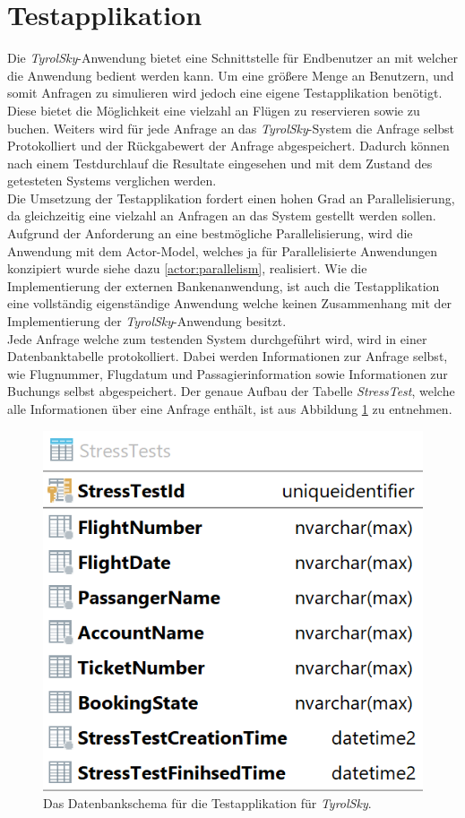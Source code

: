 \section{Testapplikation}
\label{subsec:implementation:TestApplikation} 
Die \textit{TyrolSky}-Anwendung bietet eine Schnittstelle für Endbenutzer an mit welcher die Anwendung bedient werden kann. Um eine größere Menge an Benutzern, und somit Anfragen zu simulieren wird jedoch eine eigene Testapplikation benötigt. Diese bietet die Möglichkeit eine vielzahl an Flügen zu reservieren sowie zu buchen. Weiters wird für jede Anfrage an das \textit{TyrolSky}-System die Anfrage selbst Protokolliert und der Rückgabewert der Anfrage abgespeichert. Dadurch können nach einem Testdurchlauf die Resultate eingesehen und mit dem Zustand des getesteten Systems verglichen werden. \\
Die Umsetzung der Testapplikation fordert einen hohen Grad an Parallelisierung, da gleichzeitig eine vielzahl an Anfragen an das System gestellt werden sollen. Aufgrund der Anforderung an eine bestmögliche Parallelisierung, wird die Anwendung mit dem Actor-Model, welches ja für Parallelisierte Anwendungen konzipiert wurde siehe dazu \ref{actor:parallelism}, realisiert. Wie die Implementierung der externen Bankenanwendung, ist auch die Testapplikation eine vollständig eigenständige Anwendung welche  keinen Zusammenhang mit der Implementierung der \textit{TyrolSky}-Anwendung besitzt. \\
Jede Anfrage welche zum testenden System durchgeführt wird, wird in einer Datenbanktabelle protokolliert. Dabei werden Informationen zur Anfrage selbst, wie Flugnummer, Flugdatum und Passagierinformation sowie Informationen zur Buchungs selbst abgespeichert. Der genaue Aufbau der Tabelle \textit{StressTest}, welche alle Informationen über eine Anfrage enthält, ist aus Abbildung \ref{fig:implementation:stressTestDbSchema} zu entnehmen.
\begin{figure}
    \centering
    \includegraphics[width=0.4\linewidth]{gfx/implementation/stressTestDbSchema}
    \caption{Das Datenbankschema für die Testapplikation für \textit{TyrolSky}.}
    \label{fig:implementation:stressTestDbSchema}
\end{figure} 


